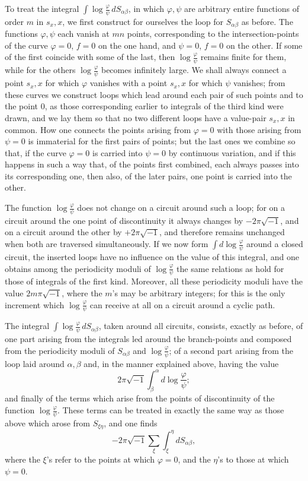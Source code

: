 \documentclass[10pt]{article}
\begin{document}
To treat the integral \(\int \log\frac{\varphi}{\psi}\,dS_{\alpha\beta}\), in which \(\varphi,\psi\) are arbitrary entire functions of order \(m\) in \(s_x,x\), we first construct for ourselves the loop for \(S_{\alpha\beta}\) as before. The functions \(\varphi,\psi\) each vanish at \(mn\) points, corresponding to the intersection-points of the curve \(\varphi=0\), \(f=0\) on the one hand, and \(\psi=0\), \(f=0\) on the other. If some of the first coincide with some of the last, then \(\log\frac{\varphi}{\psi}\) remains finite for them, while for the others \(\log\frac{\varphi}{\psi}\) becomes infinitely large. We shall always connect a point \(s_x,x\) for which \(\varphi\) vanishes with a point \(s_x,x\) for which \(\psi\) vanishes; from these curves we construct loops which lead around each pair of such points and to the point \(0\), as those corresponding earlier to integrals of the third kind were drawn, and we lay them so that no two different loops have a value-pair \(s_x,x\) in common. How one connects the points arising from \(\varphi=0\) with those arising from \(\psi=0\) is immaterial for the first pairs of points; but the last ones we combine so that, if the curve \(\varphi=0\) is carried into \(\psi=0\) by continuous variation, and if this happens in such a way that, of the points first combined, each always passes into its corresponding one, then also, of the later pairs, one point is carried into the other.

The function \(\log\frac{\varphi}{\psi}\) does not change on a circuit around such a loop; for on a circuit around the one point of discontinuity it always changes by \(-2\pi\sqrt{-1}\), and on a circuit around the other by \(+2\pi\sqrt{-1}\), and therefore remains unchanged when both are traversed simultaneously. If we now form \(\int d\log\frac{\varphi}{\psi}\) around a closed circuit, the inserted loops have no influence on the value of this integral, and one obtains among the periodicity moduli of \(\log\frac{\varphi}{\psi}\) the same relations as hold for those of integrals of the first kind. Moreover, all these periodicity moduli have the value \(2m\pi\sqrt{-1}\), where the \(m\)'s may be arbitrary integers; for this is the only increment which \(\log\frac{\varphi}{\psi}\) can receive at all on a circuit around a cyclic path.

The integral \(\int\log\frac{\varphi}{\psi}\,dS_{\alpha\beta}\), taken around all circuits, consists, exactly as before, of one part arising from the integrals led around the branch-points and composed from the periodicity moduli of \(S_{\alpha\beta}\) and \(\log\frac{\varphi}{\psi}\); of a second part arising from the loop laid around \(\alpha,\beta\) and, in the manner explained above, having the value
\[
2\pi\sqrt{-1}\int_{\beta}^{\alpha}d\log\frac{\varphi}{\psi};
\]
and finally of the terms which arise from the points of discontinuity of the function \(\log\frac{\varphi}{\psi}\). These terms can be treated in exactly the same way as those above which arose from \(S_{\xi\eta}\), and one finds
\[
-2\pi\sqrt{-1}\sum_{\xi}\int_{\xi}^{\eta}dS_{\alpha\beta},
\]
where the \(\xi\)'s refer to the points at which \(\varphi=0\), and the \(\eta\)'s to those at which \(\psi=0\).
\end{document}
